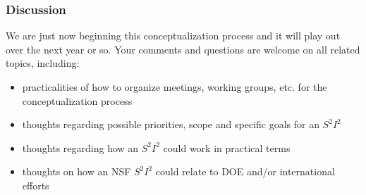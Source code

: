 \begin{frame}
\frametitle{Discussion}
We are just now beginning this conceptualization process and it will play out over the next year or so.
\vskip 0.15in
Your comments and questions are welcome on all related topics, including:
\begin{itemize}
\item practicalities of how to organize meetings, working groups, etc. for the conceptualization process
\item thoughts regarding possible priorities, scope and specific goals for an $ S^2 I^2 $
\item thoughts regarding how an $ S^2 I^2 $ could work in practical terms
\item thoughts on how an NSF $ S^2 I^2 $ could relate to DOE and/or international efforts
\end{itemize}

\end{frame}


